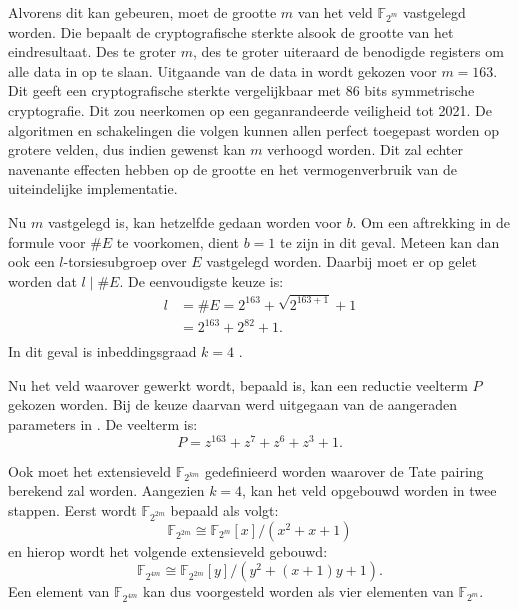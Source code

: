 Alvorens dit kan gebeuren, moet de grootte $m$ van het veld $\mathbb{F}_{2^m}$ vastgelegd worden. Die bepaalt de cryptografische sterkte alsook de grootte van het eindresultaat. Des te groter $m$, des te groter uiteraard de benodigde registers om alle data in op te slaan. Uitgaande van de data in \cite{lenstra} wordt gekozen voor $m = 163$. Dit geeft een cryptografische sterkte vergelijkbaar met 86 bits symmetrische cryptografie. Dit zou neerkomen op een geganrandeerde veiligheid tot 2021. De algoritmen en schakelingen die volgen kunnen allen perfect toegepast worden op grotere velden, dus indien gewenst kan $m$ verhoogd worden. Dit zal echter navenante effecten hebben op de grootte en het vermogenverbruik van de uiteindelijke implementatie.

Nu $m$ vastgelegd is, kan hetzelfde gedaan worden voor $b$. Om een aftrekking in de formule voor $\#E$ te voorkomen, dient $b = 1$ te zijn in dit geval. Meteen kan dan ook een $l$-torsiesubgroep over $E$ vastgelegd worden. Daarbij moet er op gelet worden dat $l \mid \#E$. De eenvoudigste keuze is:
\[\begin{aligned}
l	&= \#E = 2^{163} + \sqrt{2^{163 + 1}} + 1\\
	&= 2^{163} + 2^{82} + 1.\\
\end{aligned}\]
In dit geval is inbeddingsgraad $k = 4$ \cite{bertoni}.

Nu het veld waarover gewerkt wordt, bepaald is, kan een reductie veelterm $P$ gekozen worden. Bij de keuze daarvan werd uitgegaan van de aangeraden parameters in \cite{sec2}. De veelterm is:
\[P = z^{163} + z^7 + z^6 + z^3 + 1.\]

Ook moet het extensieveld $\mathbb{F}_{2^{k m}}$ gedefinieerd worden waarover de Tate pairing berekend zal worden. Aangezien $k = 4$, kan het veld opgebouwd worden in twee stappen. Eerst wordt $\mathbb{F}_{2^{2m}}$ bepaald als volgt:
\[\mathbb{F}_{2^{2m}} \cong \mathbb{F}_{2^m}[x]/(x^2 + x + 1)\]
en hierop wordt het volgende extensieveld gebouwd:
\[\mathbb{F}_{2^{4m}} \cong \mathbb{F}_{2^{2m}}[y]/(y^2 + (x + 1)y + 1).\]
Een element van $\mathbb{F}_{2^{4m}}$ kan dus voorgesteld worden als vier elementen van $\mathbb{F}_{2^m}$.

